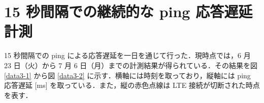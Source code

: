 \documentclass[a4j]{jarticle}
\begin{document}
\section{15 秒間隔での継続的な ping 応答遅延計測}
15 秒間隔での ping による応答遅延を一日を通じて行った．現時点では，6 月 23 日（火）から 7 月 6 日（月）までの計測結果が得られている．その結果を図 \ref{data3-1} から図 \ref{data3-2} に示す．横軸には時刻を取っており，縦軸には ping 応答遅延 [ms] を取っている．また，縦の赤色点線は LTE 接続が切断された時点を表す．
\begin{figure}[tb]
\begin{center}
~
\\
~
\end{center}
\end{figure}
\end{document}

